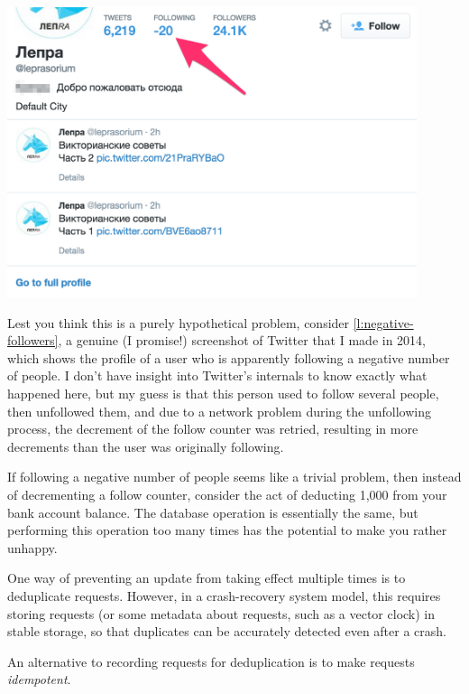 \begin{frame}[plain]
    \label{s:negative-followers}
    \includegraphics[width=12cm]{images/negative-followers.png}
\end{frame}
\label{l:negative-followers}

Lest you think this is a purely hypothetical problem, consider \autoref{l:negative-followers}, a genuine (I promise!) screenshot of Twitter that I made in 2014, which shows the profile of a user who is apparently following a negative number of people.
I don't have insight into Twitter's internals to know exactly what happened here, but my guess is that this person used to follow several people, then unfollowed them, and due to a network problem during the unfollowing process, the decrement of the follow counter was retried, resulting in more decrements than the user was originally following.

If following a negative number of people seems like a trivial problem, then instead of decrementing a follow counter, consider the act of deducting {\textsterling}1,000 from your bank account balance.
The database operation is essentially the same, but performing this operation too many times has the potential to make you rather unhappy.

One way of preventing an update from taking effect multiple times is to deduplicate requests.
However, in a crash-recovery system model, this requires storing requests (or some metadata about requests, such as a vector clock) in stable storage, so that duplicates can be accurately detected even after a crash.

An alternative to recording requests for deduplication is to make requests \emph{idempotent}.

